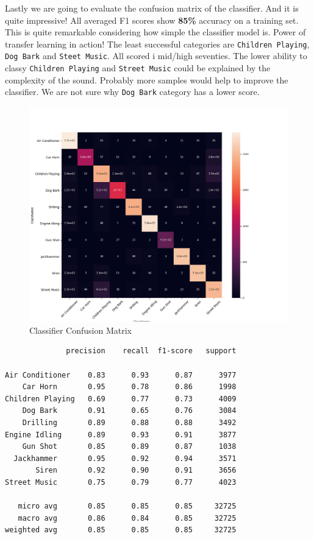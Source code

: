 Lastly we are going to evaluate the confusion matrix of the classifier.
And it is quite impressive! All averaged F1 scores show \textbf{85\%}
accuracy on a training set. This is quite remarkable considering how
simple the classifier model is. Power of transfer learning in action!
The least successful categories are \texttt{Children\ Playing},
\texttt{Dog\ Bark} and \texttt{Steet\ Music}. All scored i mid/high
seventies. The lower ability to classy \texttt{Children\ Playing} and
\texttt{Street\ Music} could be explained by the complexity of the
sound. Probably more samples would help to improve the classifier. We
are not sure why \texttt{Dog\ Bark} category has a lower score.

\begin{Schunk}
\begin{figure}[H]

{\centering \includegraphics[width=1\linewidth]{../images/Audio_DNN_heatmap} 

}

\caption[Classifier Confusion Matrix]{Classifier Confusion Matrix}\label{fig:heat}
\end{figure}
\end{Schunk}

\begin{verbatim}
              precision    recall  f1-score   support

Air Conditioner    0.83      0.93      0.87      3977
    Car Horn       0.95      0.78      0.86      1998
Children Playing   0.69      0.77      0.73      4009
    Dog Bark       0.91      0.65      0.76      3084
    Drilling       0.89      0.88      0.88      3492
Engine Idling      0.89      0.93      0.91      3877
    Gun Shot       0.85      0.89      0.87      1038
  Jackhammer       0.95      0.92      0.94      3571
       Siren       0.92      0.90      0.91      3656
Street Music       0.75      0.79      0.77      4023

   micro avg       0.85      0.85      0.85     32725
   macro avg       0.86      0.84      0.85     32725
weighted avg       0.85      0.85      0.85     32725
\end{verbatim}

